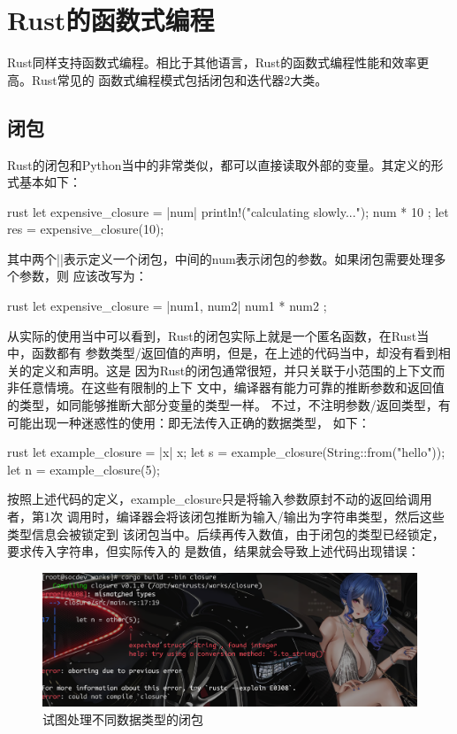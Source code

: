 \section{Rust的函数式编程}
Rust同样支持函数式编程。相比于其他语言，Rust的函数式编程性能和效率更高。Rust常见的
函数式编程模式包括闭包和迭代器2大类。

\subsection{闭包}
Rust的闭包和Python当中的非常类似，都可以直接读取外部的变量。其定义的形式基本如下：
\begin{code-block}{rust}
let expensive_closure = |num| {
    println!("calculating slowly...");
    num * 10
};
let res = expensive_closure(10);
\end{code-block}
其中两个||表示定义一个闭包，中间的num表示闭包的参数。如果闭包需要处理多个参数，则
应该改写为：
\begin{code-block}{rust}
let expensive_closure = |num1, num2| {
    num1 * num2
};
\end{code-block}

从实际的使用当中可以看到，Rust的闭包实际上就是一个匿名函数，在Rust当中，函数都有
参数类型/返回值的声明，但是，在上述的代码当中，却没有看到相关的定义和声明。这是
因为Rust的闭包通常很短，并只关联于小范围的上下文而非任意情境。在这些有限制的上下
文中，编译器有能力可靠的推断参数和返回值的类型，如同能够推断大部分变量的类型一样。
不过，不注明参数/返回类型，有可能出现一种迷惑性的使用：即无法传入正确的数据类型，
如下：
\begin{code-block}{rust}
let example_closure = |x| x;
let s = example_closure(String::from("hello"));
let n = example_closure(5);
\end{code-block}
按照上述代码的定义，example\_closure只是将输入参数原封不动的返回给调用者，第1次
调用时，编译器会将该闭包推断为输入/输出为字符串类型，然后这些类型信息会被锁定到
该闭包当中。后续再传入数值，由于闭包的类型已经锁定，要求传入字符串，但实际传入的
是数值，结果就会导致上述代码出现错误：
\begin{figure}[H]
  \centering
  \includegraphics[width=\linewidth]{rust_closure_diffrent_type.png}
  \caption{试图处理不同数据类型的闭包}
  \label{fig:rust_closure_diffrent}
\end{figure}

